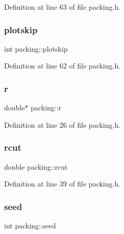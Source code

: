 Definition at line 63 of file packing.\+h.

\mbox{\label{classpacking_aa88ec1647a3bdcf9c3cc03ea03257c1b}} 
\subsubsection{\texorpdfstring{plotskip}{plotskip}}
{\footnotesize\ttfamily int packing\+::plotskip\hspace{0.3cm}{\ttfamily [protected]}}



Definition at line 62 of file packing.\+h.

\mbox{\label{classpacking_a3e301d8084ada7f0258b80639fa83c88}} 
\subsubsection{\texorpdfstring{r}{r}}
{\footnotesize\ttfamily double$\ast$ packing\+::r\hspace{0.3cm}{\ttfamily [protected]}}



Definition at line 26 of file packing.\+h.

\mbox{\label{classpacking_aefd159c50069573f1f2a3a6f0ff50984}} 
\subsubsection{\texorpdfstring{rcut}{rcut}}
{\footnotesize\ttfamily double packing\+::rcut\hspace{0.3cm}{\ttfamily [protected]}}



Definition at line 39 of file packing.\+h.

\mbox{\label{classpacking_aa5a588c50b2c22b3c2917a2da12f33e5}} 
\subsubsection{\texorpdfstring{seed}{seed}}
{\footnotesize\ttfamily int packing\+::seed\hspace{0.3cm}{\ttfamily [protected]}}




